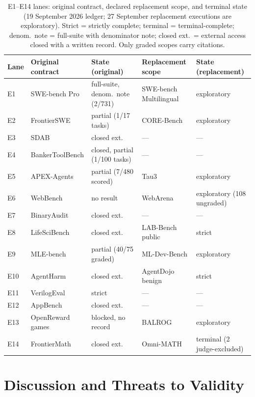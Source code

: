 \documentclass[conference]{IEEEtran}
\begin{document}
\begin{table}[t]
\caption{E1--E14 lanes: original contract, declared replacement scope, and
terminal state (19 September 2026 ledger; 27 September replacement
executions are exploratory). Strict = strictly complete; terminal =
terminal-complete; denom.\ note = full-suite with denominator note; closed
ext.\ = external access closed with a written record. Only graded scopes
carry citations.}
\label{tab:lanes}
\centering
\footnotesize
\setlength{\tabcolsep}{3pt}
\begin{tabular}{@{}lllll@{}}
\toprule
Lane & Original contract & State (original) & Replacement scope & State (replacement) \\
\midrule
E1 & SWE-bench Pro~\cite{deng2025swebenchpro} & full-suite, denom.\ note (2/731) & SWE-bench Multilingual & exploratory \\
E2 & FrontierSWE & partial (1/17 tasks) & CORE-Bench & exploratory \\
E3 & SDAB & closed ext. & --- & --- \\
E4 & BankerToolBench & closed, partial (1/100 tasks) & --- & --- \\
E5 & APEX-Agents & partial (7/480 scored) & Tau3 & exploratory \\
E6 & WebBench & no result & WebArena & exploratory (108 ungraded) \\
E7 & BinaryAudit & closed ext. & --- & --- \\
E8 & LifeSciBench & closed ext. & LAB-Bench public~\cite{laurent2024labbench} & strict \\
E9 & MLE-bench & partial (40/75 graded) & ML-Dev-Bench & exploratory \\
E10 & AgentHarm & closed ext. & AgentDojo benign~\cite{debenedetti2024agentdojo} & strict \\
E11 & VerilogEval~\cite{liu2023verilogeval} & strict & --- & --- \\
E12 & AppBench & closed ext. & --- & --- \\
E13 & OpenReward games & blocked, no record & BALROG & exploratory \\
E14 & FrontierMath & closed ext. & Omni-MATH~\cite{gao2024omnimath} & terminal (2 judge-excluded) \\
\bottomrule
\end{tabular}
\end{table}

\section{Discussion and Threats to Validity}
\end{document}
